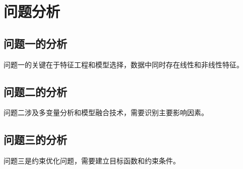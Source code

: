 \section{问题分析}


\subsection{问题一的分析}
问题一的关键在于特征工程和模型选择，数据中同时存在线性和非线性特征。

\subsection{问题二的分析}
问题二涉及多变量分析和模型融合技术，需要识别主要影响因素。

\subsection{问题三的分析}
问题三是约束优化问题，需要建立目标函数和约束条件。
